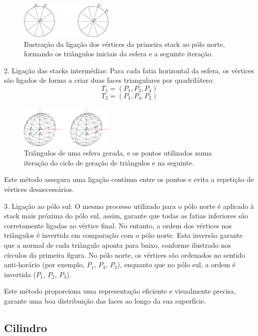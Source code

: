 \documentclass[12pt, a4paper]{article}
\begin{document}
\begin{figure}[H]
    \centering
    \includegraphics[width=0.4\textwidth]{res/figures/polosSphere.pdf}
    \caption{
        Ilustração da ligação dos vértices da primeira stack ao pólo norte, formando os triângulos
        iniciais da esfera e a seguinte iteração.
    }
\end{figure}

2. Ligação das stacks intermédias:
Para cada fatia horizontal da esfera, os vértices são ligados de forma a criar duas faces
triangulares por quadrilátero:
\[
T_1 = (P_1, P_3, P_4)
\]
\[
T_2 = (P_1, P_4, P_2)
\]

\begin{figure}[H]
    \centering
    \includegraphics[width=0.4\textwidth]{res/figures/sphere.pdf}
    \caption{
        Triângulos de uma esfera gerada, e os pontos utilizados numa iteração do ciclo de geração
        de triângulos e na seguinte.
    }
\end{figure}

Este método assegura uma ligação contínua entre os pontos e evita a repetição de vértices
desnecessários.

3. Ligação ao pólo sul: O mesmo processo utilizado para o pólo norte é aplicado à stack
mais próxima do pólo sul, assim, garante que todas as fatias inferiores são corretamente ligadas ao
vértice final.
No entanto, a ordem dos vértices nos triângulos é invertida em comparação com o pólo norte.
Esta inversão garante que a normal de cada triângulo aponta para baixo, conforme ilustrado nos
círculos da primeira figura. No pólo norte, os vértices são ordenados no sentido anti-horário
(por exemplo, $P_1$, $P_3$, $P_2$), enquanto que no pólo sul, a ordem é invertida
($P_1$, $P_2$, $P_3$).

Este método proporciona uma representação eficiente e visualmente precisa, garante uma
boa distribuição das faces ao longo da sua superfície.

\subsection{Cilindro}
\end{document}
